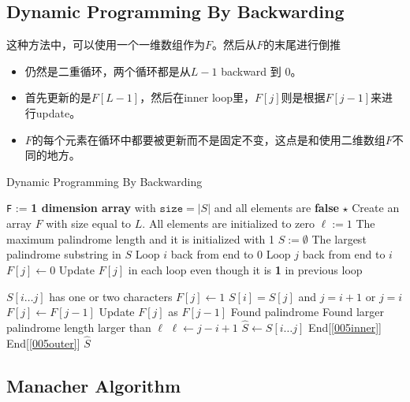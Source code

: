 \subsection{Dynamic Programming By Backwarding}
这种方法中，可以使用一个一维数组作为$F$。然后从$F$的末尾进行倒推
\begin{itemize}
\item 仍然是二重循环，两个循环都是从$L-1$ backward 到 0。
\item 首先更新的是$F[L-1]$，然后在inner loop里，$F[j]$则是根据$F[j-1]$来进行update。
\item $F$的每个元素在循环中都要被更新而不是固定不变，这点是和使用二维数组$F$不同的地方。
\end{itemize}
\begin{algorithm}[H]
\caption{Dynamic Programming By Backwarding}
\begin{algorithmic}[1]
\State \texttt{F} := \textbf{1 dimension array} with $\mathtt{size} = |S|$ and all elements are \textbf{false}
\State $\star$ Create an array $F$ with size equal to $L$. All elements are initialized to zero
\State $\ell := 1$ \Comment The maximum palindrome length and it is initialized with 1
\State $\hat{S}:=\emptyset$ \Comment The largest palindrome substring in $S$
 \Comment Loop $i$ back from end to $0$ \label{005outer}
 \Comment Loop $j$ back from end to $i$ \label{005inner}
\State $F[j] \gets 0$ \Comment Update $F[j]$ in each loop even though it is \textbf{1} in previous loop
\end{algorithmic}
\end{algorithm}
\begin{algorithm}[H]
\begin{algorithmic}[1]
\Else
{} \Comment $S[i\ldots j]$ has one or two characters
\State $F[j] \gets 1$ \Comment $S[i]=S[j]$ and $j=i+1$ or $j=i$
\Else 
\State $F[j] \gets F[j-1]$ \Comment  Update $F[j]$ as $F[j-1]$
\EndIf
\EndIf
{} \Comment Found palindrome
 \Comment Found larger palindrome length larger than $\ell$
\State $\ell \gets j-i +1$
\State $\hat{S} \gets S[i\ldots j]$
\EndIf \Comment End[\ref{005inner}]
\EndIf \Comment End[\ref{005outer}]
\EndFor
\EndFor
\State \Return $\hat{S}$
\EndProcedure
\end{algorithmic}
\end{algorithm}
\subsection{Manacher Algorithm}
